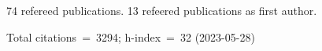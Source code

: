 74 refereed publications. 13 refeered publications as first author.

Total citations~=~3294; h-index~=~32 (2023-05-28)